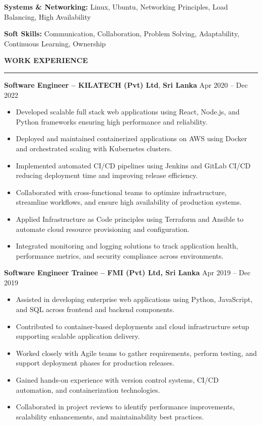 \documentclass[10pt,letterpaper]{article}
\begin{document}
\textbf{Systems \& Networking:} Linux, Ubuntu, Networking Principles, Load Balancing, High Availability

\textbf{Soft Skills:} Communication, Collaboration, Problem Solving, Adaptability, Continuous Learning, Ownership

\vspace{8pt}

\textbf{WORK EXPERIENCE}\\[-8pt]
\noindent\rule{\textwidth}{1pt}

\vspace{-2pt}

\textbf{Software Engineer -- KILATECH (Pvt) Ltd}, \textbf{Sri Lanka} \hfill Apr 2020 -- Dec 2022

\vspace{-1pt}

\begin{itemize}
\item Developed scalable full stack web applications using React, Node.js, and Python frameworks ensuring high performance and reliability.
\item Deployed and maintained containerized applications on AWS using Docker and orchestrated scaling with Kubernetes clusters.
\item Implemented automated CI/CD pipelines using Jenkins and GitLab CI/CD reducing deployment time and improving release efficiency.
\item Collaborated with cross-functional teams to optimize infrastructure, streamline workflows, and ensure high availability of production systems.
\item Applied Infrastructure as Code principles using Terraform and Ansible to automate cloud resource provisioning and configuration.
\item Integrated monitoring and logging solutions to track application health, performance metrics, and security compliance across environments.
\end{itemize}

\textbf{Software Engineer Trainee -- FMI (Pvt) Ltd, Sri Lanka} \hfill Apr 2019 -- Dec 2019

\vspace{-1pt}

\begin{itemize}
\item Assisted in developing enterprise web applications using Python, JavaScript, and SQL across frontend and backend components.
\item Contributed to container-based deployments and cloud infrastructure setup supporting scalable application delivery.
\item Worked closely with Agile teams to gather requirements, perform testing, and support deployment phases for production releases.
\item Gained hands-on experience with version control systems, CI/CD automation, and containerization technologies.
\item Collaborated in project reviews to identify performance improvements, scalability enhancements, and maintainability best practices.
\end{itemize}
\end{document}
